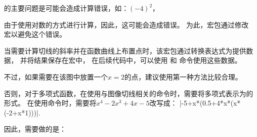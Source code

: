 \documentclass[../main.tex]{subfiles}
\begin{document}
的主要问题是可能会造成计算错误，如：$(-4)^2$，

\begin{tkzltxexample}[]
\end{tkzltxexample}

由于使用对数的方式进行计算，因此，这可能会造成错误。
为此，宏包通过修改宏以避免这个错误。

当需要计算切线的斜率并在函数曲线上布置点时，该宏包通过转换表达式为提供数据，
并将结果保存在宏中，
在后续代码中，可以使用 和 命令使用这些数据。

不过，如果需要在该图中放置一个$x=2$的点，建议使用第一种方法比较合理。

否则，对于多项式函数，在使用与图像切线相关的命令时，需要将多项式表示为的形式。
在使用命令时，需要将$x^4-2x^3+4x-5$改写成：
|-5+x*(0.5+4*x*(x*(-2+x*1)))|.\

因此，需要做的是：

\begin{center}
\begin{tkzexample}[]
\end{tkzexample}
\end{center}
\end{document}
